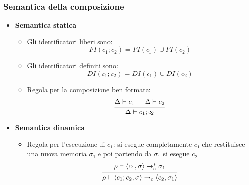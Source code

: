 \documentclass[a4paper]{article}
\begin{document}
\subsubsection{Semantica della composizione}
\begin{itemize}
  \item \textbf{Semantica statica}
    \begin{itemize}
      \item Gli identificatori liberi sono:
        \[
          FI(c_1; c_2) = FI(c_1) \cup FI(c_2)
        \]

      \item Gli identificatori definiti sono:
        \[
          DI(c_1; c_2) = DI(c_1) \cup DI(c_2)
        \]

      \item Regola per la composizione ben formata:
        \[
          \begin{prooftree}
            \hypo{ 
              \Delta \vdash c_1
            }
            \hypo{ 
              \Delta \vdash c_2
            }
            \infer2{ 
              \Delta \vdash c_1; c_2
            }
          \end{prooftree}
        \] 
    \end{itemize}

  \item \textbf{Semantica dinamica}
    \begin{itemize}
      \item Regola per l'esecuzione di \( c_1 \): si esegue completamente \( c_1 \) 
        che restituisce una nuova memoria \( \sigma_1 \) e poi partendo da \( \sigma_1 \)
        si esegue \( c_2 \)
        \[
          \begin{prooftree}
            \hypo{ 
              \rho \vdash \left< c_1, \sigma  \right> \to^*_c \sigma_1
            }
            \infer1{ 
              \rho \vdash \left< c_1; c_2, \sigma  \right> \to_c
              \left< c_2, \sigma_1 \right>
            }
          \end{prooftree}
        \] 
    \end{itemize}
\end{itemize}
\end{document}
